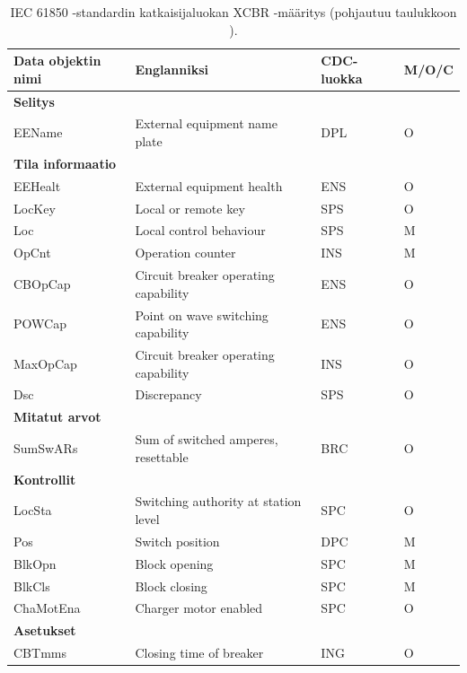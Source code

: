 \begin{table}[ht!]
	\caption{IEC 61850 -standardin katkaisijaluokan XCBR -määritys (pohjautuu taulukkoon \mbox{\cite[s.~105--106]{IEC61850-7-4}}).}
	\label{tab:iec61850-xcbr-class-definition}
	\begin{tabular}{l | l | l | l}
		\hline
		\textbf{Data objektin nimi} & \textbf{Englanniksi} & \textbf{CDC-luokka} & \textbf{M/O/C} \\
		\hline \hline
		\multicolumn{4}{l}{\textbf{Selitys}} \\
		\hline
		EEName & External equipment name plate & DPL & O \\
		\hline
		\multicolumn{4}{l}{\textbf{Tila informaatio}} \\
		\hline
		EEHealt & External equipment health & ENS & O \\
		LocKey & Local or remote key & SPS & O \\
		Loc & Local control behaviour & SPS & M \\
		OpCnt & Operation counter & INS & M \\
		CBOpCap & Circuit breaker operating capability & ENS & O \\
		POWCap & Point on wave switching capability & ENS & O \\
		MaxOpCap & Circuit breaker operating capability & INS & O \\
		Dsc & Discrepancy & SPS & O \\
		\hline
		\multicolumn{4}{l}{\textbf{Mitatut arvot}} \\
		\hline
		SumSwARs & Sum of switched amperes, resettable & BRC & O \\
		\hline
		\multicolumn{4}{l}{\textbf{Kontrollit}} \\
		\hline
		LocSta & Switching authority at station level & SPC & O \\
		Pos & Switch position & DPC & M \\
		BlkOpn & Block opening & SPC & M \\
		BlkCls & Block closing & SPC & M \\
		ChaMotEna & Charger motor enabled & SPC & O \\
		\hline
		\multicolumn{4}{l}{\textbf{Asetukset}} \\
		\hline
		CBTmms & Closing time of breaker & ING & O \\
		\hline
	\end{tabular}
\end{table}

